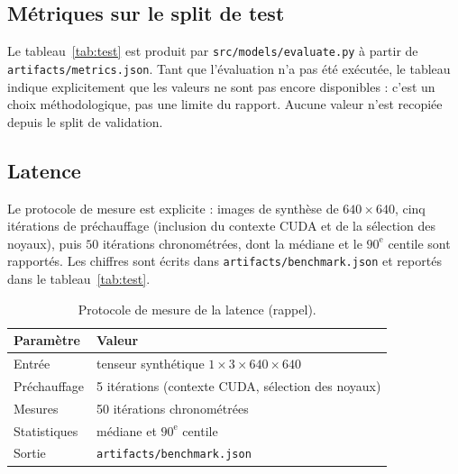 \documentclass[11pt,a4paper]{article}
\begin{document}
\subsection{Métriques sur le split de test}

Le tableau~\ref{tab:test} est produit par \texttt{src/models/evaluate.py}
à partir de \texttt{artifacts/metrics.json}. Tant que l'évaluation n'a pas
été exécutée, le tableau indique explicitement que les valeurs ne sont pas
encore disponibles : c'est un choix méthodologique, pas une limite du
rapport. Aucune valeur n'est recopiée depuis le split de validation.

\begin{table}[H]
\centering
\caption{Métriques mesurées sur le split \texttt{test} et latence d'inférence
(source : \texttt{artifacts/metrics.json} et \texttt{artifacts/benchmark.json}).}
\label{tab:test}

\end{table}

\subsection{Latence}

Le protocole de mesure est explicite : images de synthèse de
\(640 \times 640\), cinq itérations de préchauffage (inclusion du contexte
CUDA et de la sélection des noyaux), puis \(50\) itérations chronométrées,
dont la médiane et le \(90^\text{e}\) centile sont rapportés. Les chiffres
sont écrits dans \texttt{artifacts/benchmark.json} et reportés dans le
tableau~\ref{tab:test}.

\begin{table}[H]
\centering
\caption{Protocole de mesure de la latence (rappel).}
\label{tab:lat}
\begin{tabular}{@{}p{3.6cm}p{9.6cm}@{}}
\toprule
\textbf{Paramètre} & \textbf{Valeur} \\
\midrule
Entrée          & tenseur synthétique \(1 \times 3 \times 640 \times 640\) \\
Préchauffage    & 5 itérations (contexte CUDA, sélection des noyaux) \\
Mesures         & 50 itérations chronométrées \\
Statistiques    & médiane et \(90^\text{e}\) centile \\
Sortie          & \texttt{artifacts/benchmark.json} \\
\bottomrule
\end{tabular}
\end{table}
\end{document}
